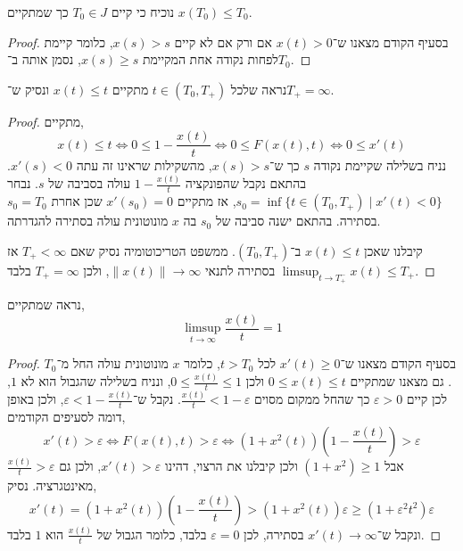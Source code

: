 \subquestion{}
נוכיח כי קיים $T_0 \in J$ כך שמתקיים $x(T_0) \le T_0$.
\begin{proof}
	בסעיף הקודם מצאנו ש־$x(t) > 0$ אם ורק אם לא קיים $x(s) > s$, כלומר קיימת לפחות נקודה אחת המקיימת $x(s) \ge s$, נסמן אותה ב־$T_0$.
\end{proof}

\subquestion{}
נראה שלכל $t \in (T_0, T_+)$ מתקיים $x(t) \le t$ ונסיק ש־$T_+ = \infty$.
\begin{proof}
	מתקיים,
	\[
		x(t) \le t
		\iff 0 \le 1 - \frac{x(t)}{t}
		\iff 0 \le F(x(t), t)
		\iff 0 \le x'(t)
	\]
	נניח בשלילה שקיימת נקודה $s$ כך ש־$x(s) > s$, מהשקילות שראינו זה עתה $x'(s) < 0$.
	בהתאם נקבל שהפונקציה $1 - \frac{x(t)}{t}$ עולה בסביבה של $s$.
	נבחר $s_0 = \inf\{ t \in (T_0, T_+) \mid x'(t) < 0 \}$, אז מתקיים $x'(s_0) = 0$ שכן אחרת $s_0 = T_0$ בסתירה.
	בהתאם ישנה סביבה של $s_0$ בה $x$ מונוטונית עולה בסתירה להגדרתה.

	קיבלנו שאכן $x(t) \le t$ ב־$(T_0, T_+)$.
	ממשפט הטריכוטומיה נסיק שאם $T_+ < \infty$ אז $\limsup_{t \to T_+^-} x(t) \le T_+$ בסתירה לתנאי $\lVert x(t) \rVert \to \infty$, ולכן $T_+ = \infty$ בלבד.
\end{proof}

\subquestion{}
נראה שמתקיים,
\[
	\limsup_{t \to \infty} \frac{x(t)}{t} = 1
\]
\begin{proof}
	בסעיף הקודם מצאנו ש־$x'(t) \ge 0$ לכל $t > T_0$, כלומר $x$ מונוטונית עולה החל מ־$T_0$.
	גם מצאנו שמתקיים $0 \le x(t) \le t$ ולכן $0 \le \frac{x(t)}{t} \le 1$, ונניח בשלילה שהגבול הוא לא $1$, לכן קיים $\varepsilon > 0$ כך שהחל ממקום מסוים $\frac{x(t)}{t} < 1 - \varepsilon$.
	נקבל ש־$\varepsilon < 1 - \frac{x(t)}{t}$, ולכן באופן דומה לסעיפים הקודמים,
	\[
		x'(t) > \varepsilon
		\iff F(x(t), t) > \varepsilon
		\iff (1 + x^2(t)) (1 - \frac{x(t)}{t}) > \varepsilon
	\]
	אבל $(1 + x^2) \ge 1$ ולכן קיבלנו את הרצוי, דהינו $x'(t) > \varepsilon$, ולכן גם $\frac{x(t)}{t} > \varepsilon$ מאינטגרציה.
	נסיק,
	\[
		x'(t)
		= (1 + x^2(t)) (1 - \frac{x(t)}{t})
		> (1 + x^2(t)) \varepsilon
		\ge (1 + \varepsilon^2 t^2) \varepsilon
	\]
	ונקבל ש־$x'(t) \to \infty$ בסתירה, לכן $\varepsilon = 0$ בלבד, כלומר הגבול של $\frac{x(t)}{t}$ הוא $1$ בלבד.
\end{proof}

